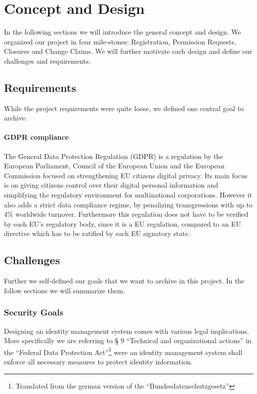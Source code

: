 
\chapter{Concept and Design}
\label{cha:conceptanddesign}
In the following sections we will introduce the general concept and design. We organized our project in four mile-stones: Registration, Permission Requests, Closures and Change Claims. 
We will further motivate each design and define our challenges and requirements.

\section{Requirements}

While the project requirements were quite loose, we defined one central goal to archive.

\subsubsection{GDPR compliance}
\label{subsubsec:GDPR_compliance}
The General Data Protection Regulation (GDPR) is a regulation by the European Parliament, Council of the European Union and the European Commission focused on strengthening EU citizens digital privacy.  Its main focus is on giving citizens control over their digital personal information and simplifying the regulatory environment for multinational corporations. However it also adds a strict data compliance regime, by penalizing transgressions with up to 4\% worldwide turnover\cite{gdpr}. Furthermore this regulation does not have to be verified by each EU's regulatory body, since it is a EU regulation, compared to an EU directive which has to be ratified by each EU signatory state.

\section{Challenges}
\label{sec:challenges}

Further we self-defined our goals that we want to archive in this project. In the follow sections we will summarize them.

\subsection{Security Goals}
\label{sec:securityGoals}

Designing an identity management system comes with various legal implications. More specifically we are referring to § 9 “Technical and organizational actions” in the “Federal Data Protection Act”\footnote{Translated from the german version of the  “Bundesdatenschutzgesetz”} were an identity management system shall enforce all necessary measures to protect identity information.\cite{bdsg}

